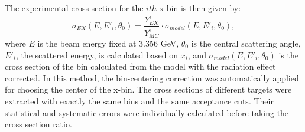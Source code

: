 	The experimental cross section for the $ith$ x-bin is then given by:
	\begin{equation}
	\sigma_{EX}(E, E'_{i},\theta_{0}) = \frac{Y^{i}_{EX}}{Y^{i}_{MC}}\cdot\sigma_{model}(E, E'_{i},\theta_{0}),
	\end{equation}
	where $E$ is the beam energy fixed at 3.356 GeV, $\theta_{0}$ is the central scattering angle, $E'_{i}$, the scattered energy, is calculated based on $x_{i}$, and $\sigma_{model}(E, E'_{i},\theta_{0})$ is the cross section of the bin calculated from the model with the radiation effect corrected.  In this method, the bin-centering correction was automatically applied for choosing the center of the x-bin. The cross sections of different targets were extracted with exactly the same bins and the same acceptance cuts. Their statistical and systematic errors were individually calculated before taking the cross section ratio.


